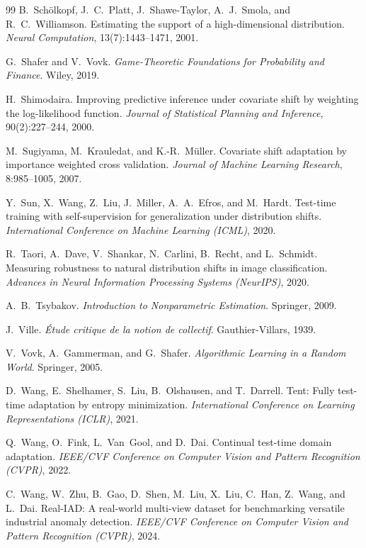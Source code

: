 \begin{thebibliography}{99}
B.~Sch\"olkopf, J.~C.~Platt, J.~Shawe-Taylor, A.~J.~Smola, and
R.~C.~Williamson.
Estimating the support of a high-dimensional distribution.
\textit{Neural Computation}, 13(7):1443--1471, 2001.

G.~Shafer and V.~Vovk.
\textit{Game-Theoretic Foundations for Probability and Finance}.
Wiley, 2019.

H.~Shimodaira.
Improving predictive inference under covariate shift by weighting the
log-likelihood function.
\textit{Journal of Statistical Planning and Inference}, 90(2):227--244, 2000.

M.~Sugiyama, M.~Krauledat, and K.-R.~M\"uller.
Covariate shift adaptation by importance weighted cross validation.
\textit{Journal of Machine Learning Research}, 8:985--1005, 2007.

Y.~Sun, X.~Wang, Z.~Liu, J.~Miller, A.~A.~Efros, and M.~Hardt.
Test-time training with self-supervision for generalization under
distribution shifts.
\textit{International Conference on Machine Learning (ICML)}, 2020.

R.~Taori, A.~Dave, V.~Shankar, N.~Carlini, B.~Recht, and L.~Schmidt.
Measuring robustness to natural distribution shifts in image classification.
\textit{Advances in Neural Information Processing Systems (NeurIPS)}, 2020.

A.~B.~Tsybakov.
\textit{Introduction to Nonparametric Estimation}.
Springer, 2009.

J.~Ville.
\textit{\'Etude critique de la notion de collectif}.
Gauthier-Villars, 1939.

V.~Vovk, A.~Gammerman, and G.~Shafer.
\textit{Algorithmic Learning in a Random World}.
Springer, 2005.

D.~Wang, E.~Shelhamer, S.~Liu, B.~Olshausen, and T.~Darrell.
Tent: Fully test-time adaptation by entropy minimization.
\textit{International Conference on Learning Representations (ICLR)}, 2021.

Q.~Wang, O.~Fink, L.~Van~Gool, and D.~Dai.
Continual test-time domain adaptation.
\textit{IEEE/CVF Conference on Computer Vision and Pattern Recognition (CVPR)}, 2022.

C.~Wang, W.~Zhu, B.~Gao, D.~Shen, M.~Liu, X.~Liu, C.~Han, Z.~Wang,
and L.~Dai.
Real-IAD: A real-world multi-view dataset for benchmarking versatile
industrial anomaly detection.
\textit{IEEE/CVF Conference on Computer Vision and Pattern Recognition (CVPR)}, 2024.


\end{thebibliography}
